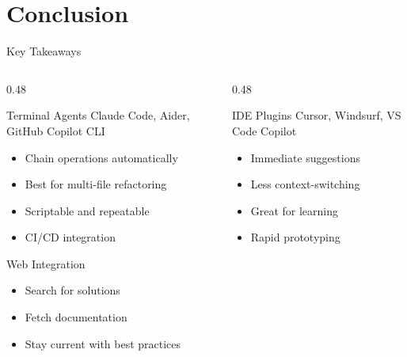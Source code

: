 \documentclass[aspectratio=169,11pt]{beamer}
\begin{document}
\section{Conclusion}

\begin{frame}{Key Takeaways}
    \begin{columns}[T]
        \begin{column}{0.48\textwidth}
            \begin{block}{Terminal Agents}
                Claude Code, Aider, GitHub Copilot CLI
                \begin{itemize}
                    \item Chain operations automatically
                    \item Best for multi-file refactoring
                    \item Scriptable and repeatable
                    \item CI/CD integration
                \end{itemize}
            \end{block}

            \begin{block}{Web Integration}
                \begin{itemize}
                    \item Search for solutions
                    \item Fetch documentation
                    \item Stay current with best practices
                \end{itemize}
            \end{block}
        \end{column}
        \begin{column}{0.48\textwidth}
            \begin{block}{IDE Plugins}
                Cursor, Windsurf, VS Code Copilot
                \begin{itemize}
                    \item Immediate suggestions
                    \item Less context-switching
                    \item Great for learning
                    \item Rapid prototyping
                \end{itemize}
            \end{block}


\end{column}
\end{columns}
\end{frame}
\end{document}
